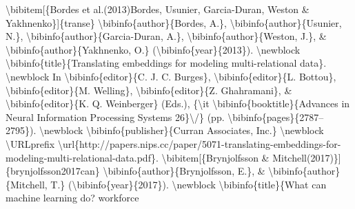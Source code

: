 \documentclass{article}%
\begin{document}
\textbackslash{}bibitem{[}\{Bordes et al.(2013)Bordes, Usunier, Garcia{-}Duran, Weston \&\newline%
Yakhnenko\}{]}\{transe\}\newline%
\textbackslash{}bibinfo\{author\}\{Bordes, A.\}, \textbackslash{}bibinfo\{author\}\{Usunier, N.\},\newline%
\textbackslash{}bibinfo\{author\}\{Garcia{-}Duran, A.\}, \textbackslash{}bibinfo\{author\}\{Weston, J.\}, \&\newline%
\textbackslash{}bibinfo\{author\}\{Yakhnenko, O.\} (\textbackslash{}bibinfo\{year\}\{2013\}).\newline%
\textbackslash{}newblock \textbackslash{}bibinfo\{title\}\{Translating embeddings for modeling multi{-}relational\newline%
data\}.\newline%
\textbackslash{}newblock In \textbackslash{}bibinfo\{editor\}\{C. J. C. Burges\}, \textbackslash{}bibinfo\{editor\}\{L. Bottou\},\newline%
\textbackslash{}bibinfo\{editor\}\{M. Welling\}, \textbackslash{}bibinfo\{editor\}\{Z. Ghahramani\}, \&\newline%
\textbackslash{}bibinfo\{editor\}\{K. Q. Weinberger\} (Eds.), \{\textbackslash{}it \textbackslash{}bibinfo\{booktitle\}\{Advances\newline%
in Neural Information Processing Systems 26\}\textbackslash{}/\} (pp.\newline%
\textbackslash{}bibinfo\{pages\}\{2787–2795\}).\newline%
\textbackslash{}newblock \textbackslash{}bibinfo\{publisher\}\{Curran Associates, Inc.\}\newline%
\textbackslash{}newblock \textbackslash{}URLprefix\newline%
\textbackslash{}url\{http://papers.nips.cc/paper/5071{-}translating{-}embeddings{-}for{-}modeling{-}multi{-}relational{-}data.pdf\}.\newline%
\newline%
\textbackslash{}bibitem{[}\{Brynjolfsson \& Mitchell(2017)\}{]}\{brynjolfsson2017can\}\newline%
\textbackslash{}bibinfo\{author\}\{Brynjolfsson, E.\}, \& \textbackslash{}bibinfo\{author\}\{Mitchell, T.\}\newline%
(\textbackslash{}bibinfo\{year\}\{2017\}).\newline%
\textbackslash{}newblock \textbackslash{}bibinfo\{title\}\{What can machine learning do? workforce\newline%
\end{document}
